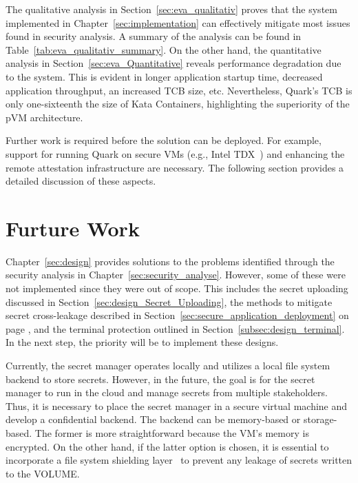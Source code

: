 The qualitative analysis in Section~\ref{sec:eva_qualitativ} proves that the system implemented in Chapter~\ref{sec:implementation} can effectively mitigate most issues found in security analysis. A summary of the analysis can be found in Table~\ref{tab:eva_qualitativ_summary}. 
On the other hand, the quantitative analysis in Section~\ref{sec:eva_Quantitative} reveals performance degradation due to the system. This is evident in longer application startup time, 
decreased application throughput, an increased \acrshort{TCB} size, etc. Nevertheless, Quark's \acrshort{TCB} is only one-sixteenth the size of Kata Containers\cite*{Kata-Containers}, highlighting the superiority of the \acrshort{pVM} architecture. 
 
Further work is required before the solution can be deployed. For example, support for running Quark on secure VMs (e.g., Intel TDX~\cite*{Intel_tdx_whitepaper}) and enhancing the remote attestation infrastructure are necessary. The following section provides a detailed discussion of these aspects.


\section{Furture Work}

Chapter~\ref{sec:design} provides solutions to the problems identified through the security analysis in Chapter~\ref{sec:security_analyse}. However, some of these were not implemented since they were out of scope. This includes the secret uploading discussed in 
Section~\ref{sec:design_Secret_Uploading}, the methods to mitigate secret cross-leakage described in Section~\ref{sec:secure_application_deployment} on page \pageref{eq:1}, and the terminal protection outlined in Section~\ref{subsec:design_terminal}. In the next step, the 
priority will be to implement these designs.

Currently, the secret manager operates locally and utilizes a local file system backend to store secrets. However, in the future, the goal is for the secret manager to run in the cloud and manage secrets from multiple stakeholders. Thus, it is necessary to place the secret manager in 
a secure virtual machine and develop a confidential backend. The backend can be memory-based or storage-based. The former is more straightforward because the VM's memory is encrypted. On the other hand, if the latter option is chosen, it is essential to 
incorporate a file system shielding layer~\cite*{file_system_shield} to prevent any leakage of secrets written to the VOLUME.

